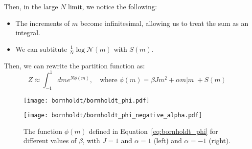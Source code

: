 Then, in the large $N$ limit, we notice the following:
\begin{itemize}
    \item The increments of $m$ become infinitesimal, allowing us to treat the sum as an integral.
    \item We can subtitute $\frac{1}{N}\log\mathcal{N}(m)$ with $S(m)$.
\end{itemize}
Then, we can rewrite the partition function as:
\begin{equation}
    Z \approx \int_{-1}^{1} dm e^{N\phi(m)}, \quad \text{where }
    \phi(m) = \beta J m^2 + \alpha m |m| + S(m)
    \label{eq:bornholdt_phi}
\end{equation}
\begin{figure}[h]
    \centering
    \begin{minipage}[t]{0.45\textwidth}
        \centering
        \texttt{[image: bornholdt/bornholdt\_phi.pdf]}
    \end{minipage}
    \hfill
    \begin{minipage}[t]{0.45\textwidth}
        \centering
        \texttt{[image: bornholdt/bornholdt\_phi\_negative\_alpha.pdf]}
    \end{minipage}
    \caption{The function $\phi(m)$ defined in Equation~\ref{eq:bornholdt_phi} for different values of $\beta$, with $J=1$ and $\alpha=1$ (left) and $\alpha=-1$ (right).}
    \label{fig:bornholdt_phi}
\end{figure}

